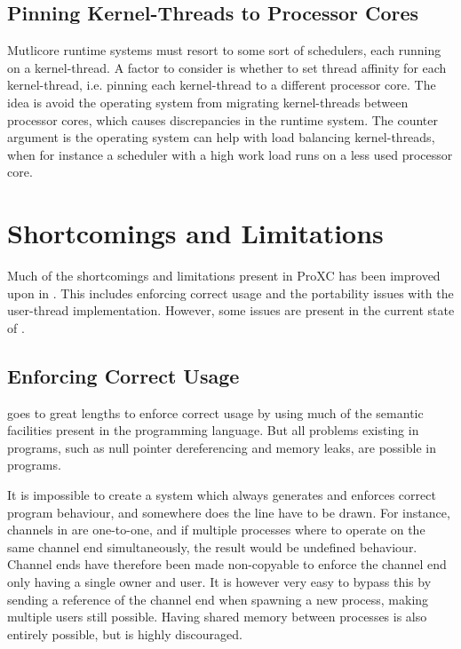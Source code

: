 \section{Pinning Kernel\hyp{}Threads to Processor Cores}


Mutlicore runtime systems must resort to some sort of schedulers, each running on a kernel\hyp{}thread. A factor to consider is whether to set thread affinity for each kernel\hyp{}thread, i.e. pinning each kernel\hyp{}thread to a different processor core. The idea is avoid the operating system from migrating kernel\hyp{}threads between processor cores, which causes discrepancies in the runtime system. The counter argument is the operating system can help with load balancing kernel\hyp{}threads, when for instance a scheduler with a high work load runs on a less used processor core.


\chapter{Shortcomings and Limitations}
\label{ch:shortcomings_limitations}


Much of the shortcomings and limitations present in ProXC has been improved upon in \Proxc{}. This includes enforcing correct usage and the portability issues with the user\hyp{}thread implementation. However, some issues are present in the current state of \Proxc{}.


\section{Enforcing Correct Usage}


\Proxc{} goes to great lengths to enforce correct usage by using much of the semantic facilities present in the \Cpp{} programming language. But all problems existing in \Cpp{} programs, such as null pointer dereferencing and memory leaks, are possible in \Proxc{} programs.  

It is impossible to create a system which always generates and enforces correct program behaviour, and somewhere does the line have to be drawn. For instance, channels in \Proxc{} are one\hyp{}to\hyp{}one, and if multiple processes where to operate on the same channel end simultaneously, the result would be undefined behaviour. Channel ends have therefore been made non\hyp{}copyable to enforce the channel end only having a single owner and user. It is however very easy to bypass this by sending a reference of the channel end when spawning a new process, making multiple users still possible. Having shared memory between processes is also entirely possible, but is highly discouraged.

